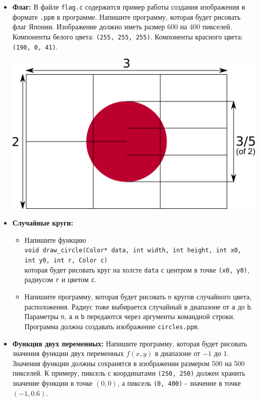 \documentclass{article}
\begin{document}
\begin{itemize}
\item \textbf{Флаг:} В файле \texttt{flag.c} содержится пример работы создания изображения в формате \texttt{.ppm} в программе. Напишите программу, которая будет рисовать флаг Японии. Изображение должно иметь размер 600 на 400 пикселей. Компоненты белого цвета: \texttt{(255, 255, 255)}. Компоненты красного цвета: \texttt{(190, 0, 41)}.
\begin{center}
\includegraphics[scale=0.15]{../images/japanflag.png}
\end{center}
\item \textbf{Случайные круги:} 
\begin{itemize}
\item Напишите функцию \\
\texttt{void draw\_circle(Color* data, int width, int height, int x0, int y0, int r, Color c)}\\
которая будет рисовать круг на холсте \texttt{data} с центром в точке \texttt{(x0, y0)}, радиусом \texttt{r} и цветом \texttt{c}.
\item Напишите программу, которая будет рисовать \texttt{n} кругов случайного цвета, расположения. Радиус тоже выбирается случайный в диапазоне от \texttt{a} до \texttt{b}. Параметры \texttt{n}, \texttt{a} и \texttt{b} передаются через аргументы командной строки. Программа должна создавать изображение \texttt{circles.ppm}.
\end{itemize}
\item \textbf{Функция двух переменных:} Напишите программу, которая будет рисовать значения функции двух переменных $f(x, y)$ в диапазоне от $-1$ до $1$.\\
 Значения функции должны сохранятся в изображении размером 500 на 500 пикселей. К примеру, пиксель с координатами \texttt{(250, 250)} должен хранить значение функции в точке $(0, 0)$, а пиксель \texttt{(0, 400)} - значение в точке $(-1, 0.6)$. \\

\end{itemize}
\end{document}
